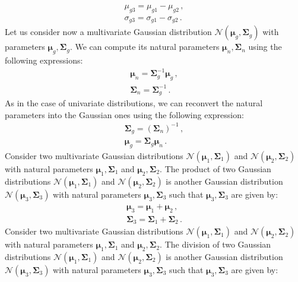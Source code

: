 \begin{align}
\mu_{g3} = \mu_{g1} - \mu_{g2} \,, \\
\sigma_{g3} = \sigma_{g1} - \sigma_{g2} \,.
\end{align}
Let us consider now a multivariate Gaussian distribution $\mathcal{N}(\boldsymbol{\mu}_g, \boldsymbol{\Sigma}_g)$ with parameters $\boldsymbol{\mu}_g, \boldsymbol{\Sigma}_g$. We can compute its natural parameters $\boldsymbol{\mu}_n, \boldsymbol{\Sigma}_n$ using the following expressions:
\begin{align}
\boldsymbol{\mu}_n = \boldsymbol{\Sigma}_g^{-1} \boldsymbol{\mu}_g \,, \\
\boldsymbol{\Sigma}_n = \boldsymbol{\Sigma}_g^{-1} \,.
\end{align}
As in the case of univariate distributions, we can reconvert the natural parameters into the Gaussian ones using the following expression:
\begin{align}
\boldsymbol{\Sigma}_g = (\boldsymbol{\Sigma}_n)^{-1} \,, \\
\boldsymbol{\mu}_g = \boldsymbol{\Sigma}_g \boldsymbol{\mu}_n \,. 
\end{align}
Consider two multivariate Gaussian distributions $\mathcal{N}(\boldsymbol{\mu}_1, \boldsymbol{\Sigma}_1)$ and $\mathcal{N}(\boldsymbol{\mu}_2, \boldsymbol{\Sigma}_2)$ with natural parameters $\boldsymbol{\mu}_1, \boldsymbol{\Sigma}_1$ and $\boldsymbol{\mu}_2, \boldsymbol{\Sigma}_2$. The product of two Gaussian distributions $\mathcal{N}(\boldsymbol{\mu}_1, \boldsymbol{\Sigma}_1)$ and $\mathcal{N}(\boldsymbol{\mu}_2, \boldsymbol{\Sigma}_2)$ is another Gaussian distribution $\mathcal{N}(\boldsymbol{\mu}_3, \boldsymbol{\Sigma}_3)$ with natural parameters $\boldsymbol{\mu}_3, \boldsymbol{\Sigma}_3$ such that $\boldsymbol{\mu}_3, \boldsymbol{\Sigma}_3$ are given by:
\begin{align}
\boldsymbol{\mu}_3 = \boldsymbol{\mu}_1 + \boldsymbol{\mu}_2\,, \\
\boldsymbol{\Sigma}_3 = \boldsymbol{\Sigma}_1 + \boldsymbol{\Sigma}_2 \,.
\end{align}
Consider two multivariate Gaussian distributions $\mathcal{N}(\boldsymbol{\mu}_1, \boldsymbol{\Sigma}_1)$ and $\mathcal{N}(\boldsymbol{\mu}_2, \boldsymbol{\Sigma}_2)$ with natural parameters $\boldsymbol{\mu}_1, \boldsymbol{\Sigma}_1$ and $\boldsymbol{\mu}_2, \boldsymbol{\Sigma}_2$. The division of two Gaussian distributions $\mathcal{N}(\boldsymbol{\mu}_1, \boldsymbol{\Sigma}_1)$ and $\mathcal{N}(\boldsymbol{\mu}_2, \boldsymbol{\Sigma}_2)$ is another Gaussian distribution $\mathcal{N}(\boldsymbol{\mu}_3, \boldsymbol{\Sigma}_3)$ with natural parameters $\boldsymbol{\mu}_3, \boldsymbol{\Sigma}_3$ such that $\boldsymbol{\mu}_3, \boldsymbol{\Sigma}_3$ are given by:
